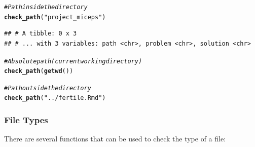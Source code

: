 \documentclass[APA,LATO1COL]{WileyNJD-v2}\usepackage[]{graphicx}\usepackage[]{color}
\makeatletter
\newcommand{\hlstr}[1]{\textcolor[rgb]{0.192,0.494,0.8}{#1}}%
\newcommand{\hlcom}[1]{\textcolor[rgb]{0.678,0.584,0.686}{\textit{#1}}}%
\newcommand{\hlstd}[1]{\textcolor[rgb]{0.345,0.345,0.345}{#1}}%
\newcommand{\hlkwd}[1]{\textcolor[rgb]{0.737,0.353,0.396}{\textbf{#1}}}%
\newenvironment{kframe}{%
 \def\at@end@of@kframe{}%
 \ifinner\ifhmode%
  \def\at@end@of@kframe{\end{minipage}}%
  \begin{minipage}{\columnwidth}%
 \fi\fi%
 \def\FrameCommand##1{\hskip\@totalleftmargin \hskip-\fboxsep
 \colorbox{shadecolor}{##1}\hskip-\fboxsep
     \hskip-\linewidth \hskip-\@totalleftmargin \hskip\columnwidth}%
 \MakeFramed {\advance\hsize-\width
   \@totalleftmargin\z@ \linewidth\hsize
   \@setminipage}}%
 {\par\unskip\endMakeFramed%
 \at@end@of@kframe}
\newenvironment{knitrout}{}{} %
\makeatother
\begin{document}
\begin{knitrout}
\color{fgcolor}\begin{kframe}
\begin{alltt}
\hlcom{# Path inside the directory}
\hlkwd{check_path}\hlstd{(}\hlstr{"project_miceps"}\hlstd{)}
\end{alltt}
\begin{verbatim}
## # A tibble: 0 x 3
## # ... with 3 variables: path <chr>, problem <chr>, solution <chr>
\end{verbatim}
\begin{alltt}
\hlcom{# Absolute path (current working directory)}
\hlkwd{check_path}\hlstd{(}\hlkwd{getwd}\hlstd{())}
\end{alltt}


{\ttfamily\noindent\bfseries\color{errorcolor}{\#\# Error: Detected absolute paths. Absolute paths are not reproducible and will likely only work on your computer.}}\begin{alltt}
\hlcom{# Path outside the directory}
\hlkwd{check_path}\hlstd{(}\hlstr{"../fertile.Rmd"}\hlstd{)}
\end{alltt}


{\ttfamily\noindent\bfseries\color{errorcolor}{\#\# Error: Detected paths that lead outside the project directory. Such paths are not reproducible and will likely only work on your computer.}}\end{kframe}
\end{knitrout}

\subsubsection{File Types}

There are several functions that can be used to check the type of a file: 
\end{document}

